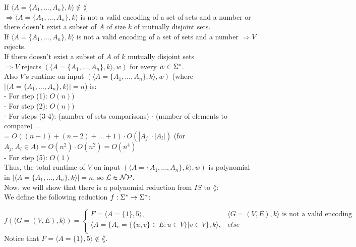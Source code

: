 If $\langle A = \{A_1, ..., A_n\}, k \rangle \notin \lang$ \\
$\Rightarrow \langle A = \{A_1, ..., A_n\}, k \rangle$ is not a valid encoding of a set of sets and a number
or there doesn't exist a subset of $A$ of size $k$ of mutually disjoint sets. \\
If $\langle A = \{A_1, ..., A_n\}, k \rangle$ is not a valid encoding of a set of sets and a number $\Rightarrow V$ rejects. \\
If there doesn't exist a subset of $A$ of $k$ mutually disjoint sets \\
$\Rightarrow V$ rejects $(\langle A = \{A_1, ..., A_n\}, k \rangle, w)$ for every $w \in \Sigma^*$. \\

Also $V$'s runtime on input $(\langle A = \{A_1, ..., A_n\}, k \rangle, w)$
(where $|\langle A = \{A_1, ..., A_n\}, k \rangle|=n$) is: \\
- For step (1): $O(n))$  \\
- For step (2): $O(n))$  \\
- For steps (3-4): (number of sets comparisons) $\cdot$ (number of elements to compare) = \\
= $O((n-1)+(n-2)+...+1) \cdot O(|A_j| \cdot |A_l|)$ (for $A_j, A_l \in A) = O(n^2) \cdot O(n^2) = O(n^4)$ \\
- For step (5): $O(1)$ \\
Thus, the total runtime of $V$ on input  $(\langle A = \{A_1, ..., A_n\}, k \rangle, w)$ is polynomial \\
in $|\langle A = \{A_1, ..., A_n\}, k \rangle|=n$, so \underline{$\mathcal{L} \in \mathcal{N}\mathcal{P}$}. \\

Now, we will show that there is a polynomial reduction from $IS$ to $\lang$: \\
We define the following reduction $f: \Sigma^* \rightarrow \Sigma^*$:

$
    f(\langle G=(V,E), k \rangle) =
    \begin{cases}
        F = \langle A=\{1\}, 5 \rangle,                                      & \langle G=(V,E), k \rangle \text{ is not a valid encoding } \\
        \langle A=\{A_v = \{\{u,v\} \in E: u \in V\} | v \in V\}, k \rangle, & else                                                        \\
    \end{cases}
$
Notice that  $F = \langle A=\{1\}, 5 \rangle \notin \lang$. \\

